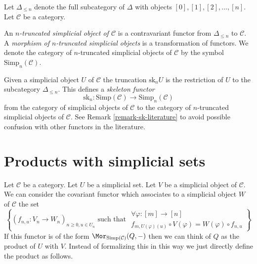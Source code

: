 \noindent
Let $\Delta_{\leq n}$ denote the full subcategory of
$\Delta$ with objects $[0], [1], [2], \ldots, [n]$.
Let $\mathcal{C}$ be a category.

\begin{definition}
\label{definition-truncated-simplicial-object}
An {\it $n$-truncated simplicial object of $\mathcal{C}$}
is a contravariant functor from $\Delta_{\leq n}$ to
$\mathcal{C}$. A {\it morphism of $n$-truncated
simplicial objects} is a transformation of functors.
We denote the category of $n$-truncated
simplicial objects of $\mathcal{C}$ by
the symbol $\text{Simp}_n(\mathcal{C})$.
\end{definition}

\noindent
Given a simplicial object $U$ of $\mathcal{C}$
the truncation $\text{sk}_n U$ is the restriction
of $U$ to the subcategory $\Delta_{\leq n}$.
This defines a {\it skeleton functor}
$$
\text{sk}_n :
\text{Simp}(\mathcal{C}) \longrightarrow \text{Simp}_n(\mathcal{C})
$$
from the category of simplicial objects of $\mathcal{C}$
to the category of $n$-truncated simplicial objects of $\mathcal{C}$.
See Remark \ref{remark-sk-literature} to avoid possible confusion
with other functors in the literature.




\section{Products with simplicial sets}
\label{section-product-with-simplicial-sets}

\noindent
Let $\mathcal{C}$ be a category.
Let $U$ be a simplicial set.
Let $V$ be a simplicial object of $\mathcal{C}$.
We can consider the covariant functor which associates
to a simplicial object $W$ of $\mathcal{C}$
the set
\begin{equation}
\label{equation-functor-product-with-simplicial-set}
\left\{
(f_{n, u} : V_n \to W_n)_{n \geq 0, u \in U_n}
\text{ such that }
\begin{matrix}
\forall \varphi : [m] \to [n] \\
f_{m, U(\varphi)(u)} \circ V(\varphi) = W(\varphi) \circ f_{n, u}
\end{matrix}
\right\}
\end{equation}
If this functor is of the form
$\Mor_{\text{Simp}(\mathcal{C})}(Q, -)$
then we can think of $Q$ as the product of $U$ with $V$.
Instead of formalizing this in this way we just directly
define the product as follows.

